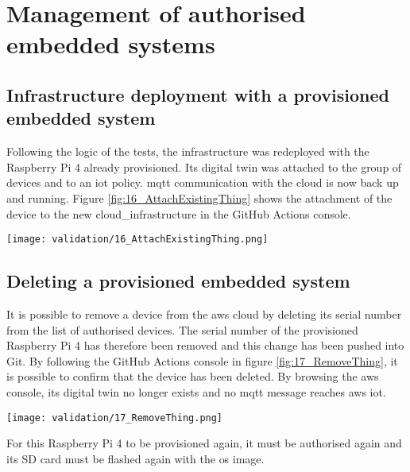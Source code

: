 \section{Management of authorised embedded systems}

\subsection{Infrastructure deployment with a provisioned embedded system}
Following the logic of the tests, the infrastructure was redeployed with the Raspberry Pi 4 already provisioned. Its digital twin was attached to the group of devices and to an \acrshort{iot} policy. \acrshort{mqtt} communication with the \gls{cloud} is now back up and running. Figure \ref{fig:16_AttachExistingThing} shows the attachment of the device to the new \gls{cloud_infrastructure} in the GitHub Actions console.
\begin{center}
    \begingroup
    \texttt{[image: validation/16\_AttachExistingThing.png]}
    \label{fig:16_AttachExistingThing}
    \endgroup
\end{center}

\subsection{Deleting a provisioned embedded system}
It is possible to remove a device from the \gls{aws} \gls{cloud} by deleting its serial number from the list of authorised devices. The serial number of the provisioned Raspberry Pi 4 has therefore been removed and this change has been pushed into Git. By following the GitHub Actions console in figure \ref{fig:17_RemoveThing}, it is possible to confirm that the device has been deleted. By browsing the \gls{aws} console, its digital twin no longer exists and no \acrshort{mqtt} message reaches \gls{aws} \acrshort{iot}.
\begin{center}
    \begingroup
    \texttt{[image: validation/17\_RemoveThing.png]}
    \label{fig:17_RemoveThing}
    \endgroup
\end{center}
For this Raspberry Pi 4 to be provisioned again, it must be authorised again and its SD card must be flashed again with the \acrshort{os} image.

